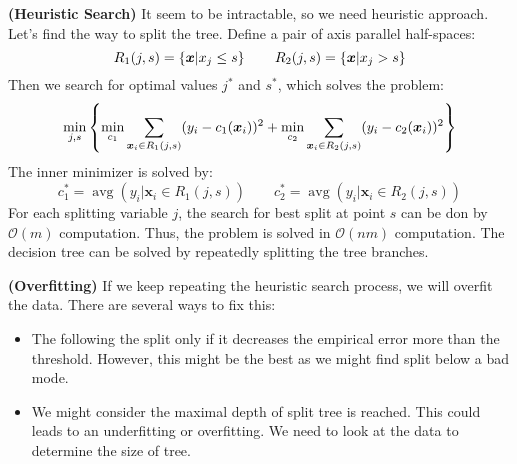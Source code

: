 \begin{definition}{\textbf{(Heuristic Search)}}
    It seem to be intractable, so we need heuristic approach. Let's find the way to split the tree. Define a pair of axis parallel half-spaces:
    \begin{equation*}
        R_1 (j, s) = \left\{ \boldsymbol x | x_j \le s \right\} \qquad R_2(j, s) = \left\{ \boldsymbol x | x_j > s \right\}
    \end{equation*}
    Then we search for optimal values $j^*$ and $s^*$, which solves the problem:
    \begin{equation*}
        \min_{j, s} \left\{ \min_{c_1} \sum_{\boldsymbol x_i \in R_1(j, s)} (y_i - c_1(\boldsymbol x_i))^2 + \min_{c_2}\sum_{\boldsymbol x_i \in R_2(j, s)} (y_i - c_2(\boldsymbol x_i))^2  \right\}
    \end{equation*}
    The inner minimizer is solved by:
    \begin{equation*}
        c^*_1 = \operatorname{avg}(y_i | \boldsymbol x_i \in R_1(j, s)) \qquad c_2^* = \operatorname{avg}(y_i | \boldsymbol x_i \in R_2(j, s))
    \end{equation*}
    For each splitting variable $j$, the search for best split at point $s$ can be don by $\mathcal{O}(m)$ computation. Thus, the problem is solved in $\mathcal{O}(nm)$ computation. The decision tree can be solved by repeatedly splitting the tree branches. 
\end{definition}

\begin{remark}{\textbf{(Overfitting)}}
    If we keep repeating the heuristic search process, we will overfit the data. There are several ways to fix this:
    \begin{itemize}
        \item The following the split only if it decreases the empirical error more than the threshold. However, this might be the best as we might find split below a bad mode. 
        \item We might consider the maximal depth of split tree is reached. This could leads to an underfitting or overfitting. We need to look at the data to determine the size of tree. 
    \end{itemize}
\end{remark}

